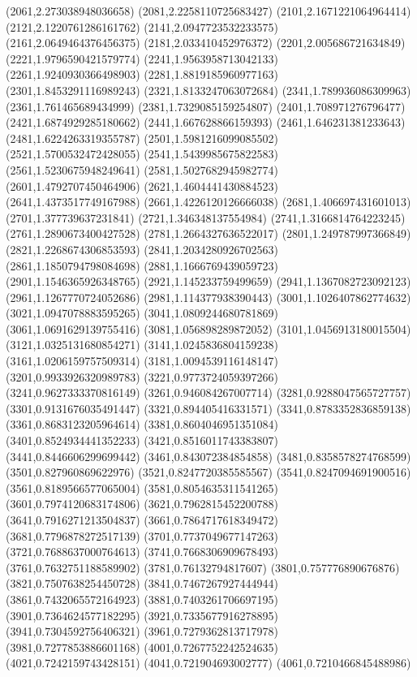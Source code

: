 {(2061,2.273038948036658)
(2081,2.2258110725683427)
(2101,2.1671221064964414)
(2121,2.1220761286161762)
(2141,2.0947723532233575)
(2161,2.0649464376456375)
(2181,2.033410452976372)
(2201,2.005686721634849)
(2221,1.9796590421579774)
(2241,1.9563958713042133)
(2261,1.9240930366498903)
(2281,1.8819185960977163)
(2301,1.8453291116989243)
(2321,1.8133247063072684)
(2341,1.789936086309963)
(2361,1.761465689434999)
(2381,1.7329085159254807)
(2401,1.708971276796477)
(2421,1.6874929285180662)
(2441,1.667628866159393)
(2461,1.646231381233643)
(2481,1.6224263319355787)
(2501,1.5981216099085502)
(2521,1.5700532472428055)
(2541,1.5439985675822583)
(2561,1.5230675948249641)
(2581,1.5027682945982774)
(2601,1.4792707450464906)
(2621,1.4604441430884523)
(2641,1.4373517749167988)
(2661,1.4226120126666038)
(2681,1.406697431601013)
(2701,1.377739637231841)
(2721,1.346348137554984)
(2741,1.3166814764223245)
(2761,1.2890673400427528)
(2781,1.2664327636522017)
(2801,1.249787997366849)
(2821,1.2268674306853593)
(2841,1.2034280926702563)
(2861,1.1850794798084698)
(2881,1.1666769439059723)
(2901,1.1546365926348765)
(2921,1.145233759499659)
(2941,1.1367082723092123)
(2961,1.1267770724052686)
(2981,1.114377938390443)
(3001,1.1026407862774632)
(3021,1.0947078883595265)
(3041,1.0809244680781869)
(3061,1.0691629139755416)
(3081,1.056898289872052)
(3101,1.0456913180015504)
(3121,1.0325131680854271)
(3141,1.0245836804159238)
(3161,1.0206159757509314)
(3181,1.0094539116148147)
(3201,0.9933926320989783)
(3221,0.9773724059397266)
(3241,0.9627333370816149)
(3261,0.946084267007714)
(3281,0.9288047565727757)
(3301,0.9131676035491447)
(3321,0.894405416331571)
(3341,0.8783352836859138)
(3361,0.8683123205964614)
(3381,0.8604046951351084)
(3401,0.8524934441352233)
(3421,0.8516011743383807)
(3441,0.8446606299699442)
(3461,0.843072384854858)
(3481,0.8358578274768599)
(3501,0.827960869622976)
(3521,0.8247720385585567)
(3541,0.8247094691900516)
(3561,0.8189566577065004)
(3581,0.8054635311541265)
(3601,0.7974120683174806)
(3621,0.7962815452200788)
(3641,0.7916271213504837)
(3661,0.7864717618349472)
(3681,0.7796878272517139)
(3701,0.7737049677147263)
(3721,0.7688637000764613)
(3741,0.7668306909678493)
(3761,0.7632751188589902)
(3781,0.76132794817607)
(3801,0.757776890676876)
(3821,0.7507638254450728)
(3841,0.7467267927444944)
(3861,0.7432065572164923)
(3881,0.7403261706697195)
(3901,0.7364624577182295)
(3921,0.7335677916278895)
(3941,0.7304592756406321)
(3961,0.7279362813717978)
(3981,0.7277853886601168)
(4001,0.7267752242524635)
(4021,0.7242159743428151)
(4041,0.721904693002777)
(4061,0.7210466845488986)
}
